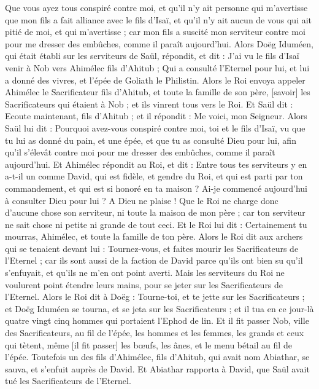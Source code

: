 \begin{multicols}{2}
Que vous ayez tous conspiré contre moi, et qu'il n'y ait personne qui m'avertisse que mon fils a fait alliance avec le fils d'Isaï, et qu'il n'y ait aucun de vous qui ait pitié de moi, et qui m'avertisse ; car mon fils a suscité mon serviteur contre moi pour me dresser des embûches, comme il paraît aujourd'hui.
Alors Doëg Iduméen, qui était établi sur les serviteurs de Saül, répondit, et dit : J'ai vu le fils d'Isaï venir à Nob vers Ahimélec fils d'Ahitub ;
Qui a consulté l'Eternel pour lui, et lui a donné des vivres, et l'épée de Goliath le Philistin.
Alors le Roi envoya appeler Ahimélec le Sacrificateur fils d'Ahitub, et toute la famille de son père, [savoir] les Sacrificateurs qui étaient à Nob ; et ils vinrent tous vers le Roi.
Et Saül dit : Ecoute maintenant, fils d'Ahitub ; et il répondit : Me voici, mon Seigneur.
Alors Saül lui dit : Pourquoi avez-vous conspiré contre moi, toi et le fils d'Isaï, vu que tu lui as donné du pain, et une épée, et que tu as consulté Dieu pour lui, afin qu'il s'élevât contre moi pour me dresser des embûches, comme il paraît aujourd'hui.
Et Ahimélec répondit au Roi, et dit : Entre tous tes serviteurs y en a-t-il un comme David, qui est fidèle, et gendre du Roi, et qui est parti par ton commandement, et qui est si honoré en ta maison ?
Ai-je commencé aujourd'hui à consulter Dieu pour lui ? A Dieu ne plaise ! Que le Roi ne charge donc d'aucune chose son serviteur, ni toute la maison de mon père ; car ton serviteur ne sait chose ni petite ni grande de tout ceci.
Et le Roi lui dit : Certainement tu mourras, Ahimélec, et toute la famille de ton père.
Alors le Roi dit aux archers qui se tenaient devant lui : Tournez-vous, et faites mourir les Sacrificateurs de l'Eternel ; car ils sont aussi de la faction de David parce qu'ils ont bien su qu'il s'enfuyait, et qu'ils ne m'en ont point averti. Mais les serviteurs du Roi ne voulurent point étendre leurs mains, pour se jeter sur les Sacrificateurs de l'Eternel.
Alors le Roi dit à Doëg : Tourne-toi, et te jette sur les Sacrificateurs ; et Doëg Iduméen se tourna, et se jeta sur les Sacrificateurs ; et il tua en ce jour-là quatre vingt cinq hommes qui portaient l'Ephod de lin.
Et il fit passer Nob, ville des Sacrificateurs, au fil de l'épée, les hommes et les femmes, les grands et ceux qui tètent, même [il fit passer] les bœufs, les ânes, et le menu bétail au fil de l'épée.
Toutefois un des fils d'Ahimélec, fils d'Ahitub, qui avait nom Abiathar, se sauva, et s'enfuit auprès de David.
Et Abiathar rapporta à David, que Saül avait tué les Sacrificateurs de l'Eternel.

\end{multicols}

